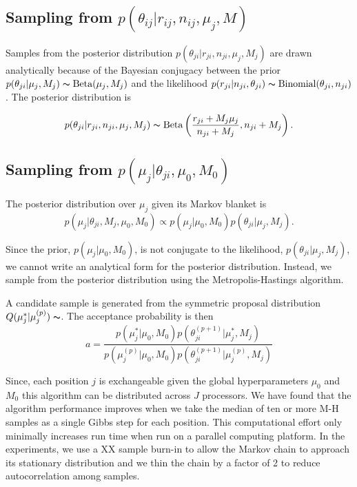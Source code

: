 \documentclass[11pt,reqno]{amsart}
\begin{document}
\subsection{Sampling from $p \left( \theta_{ij} |r_{ij},n_{ij},\mu_j,M \right)$}

Samples from the posterior distribution $p(\theta_{ji} | r_{ji}, n_{ji}, \mu_j, M_j)$ are drawn analytically because of the Bayesian conjugacy between the prior $p(\theta_{ji} | \mu_j, M_j) \thicksim \text{Beta}(\mu_j, M_j)$ and the likelihood $p(r_{ji} | n_{ji}, \theta_{ji}) \thicksim \text{Binomial}(\theta_{ji}, n_{ji})$. The posterior distribution is 

\begin{equation}
	p(\theta_{ji} | r_{ji}, n_{ji}, \mu_j, M_j) \thicksim \text{Beta}\left( \frac{r_{ji} + M_j \mu_j}{n_{ji} + M_j} , n_{ji} + M_j\right).
\end{equation}

\subsection{Sampling from $p \left( \mu_j |\theta_{ji},\mu_0,M_0\right)$}
The posterior distribution over $\mu_j$ given its Markov blanket is 
\begin{equation}
	p( \mu_j | \theta_{ji}, M_j, \mu_0, M_0 ) \propto p(\mu_j | \mu_0, M_0) p(\theta_{ji} | \mu_j, M_j).
\end{equation}

Since the prior, $p(\mu_j | \mu_0, M_0)$, is not conjugate to the likelihood, $p(\theta_{ji} | \mu_j, M_j)$, we cannot write an analytical form for the posterior distribution. Instead, we sample from the posterior distribution using the Metropolis-Hastings algorithm.

A candidate sample is generated from the symmetric proposal distribution $Q(\mu_j^* | \mu_j^{(p)}) \thicksim $. The acceptance probability is then
\begin{equation}
	a = \frac{ p(\mu_j^* | \mu_0, M_0) p(\theta^{(p+1)}_{ji} | \mu_j^*, M_j) } {p(\mu_j^{(p)} | \mu_0, M_0) p(\theta^{(p+1)}_{ji} | \mu_j^{(p)}, M_j)}
\end{equation}

Since, each position $j$ is exchangeable given the global hyperparameters $\mu_0$ and $M_0$ this algorithm can be distributed across $J$ processors. We have found that the algorithm performance improves when we take the median of ten or more M-H samples as a single Gibbs step for each position. This computational effort only minimally increases run time when run on a parallel computing platform. In the experiments, we use a XX sample burn-in to allow the Markov chain to approach its stationary distribution and we thin the chain by a factor of 2 to reduce autocorrelation among samples.
\end{document}
